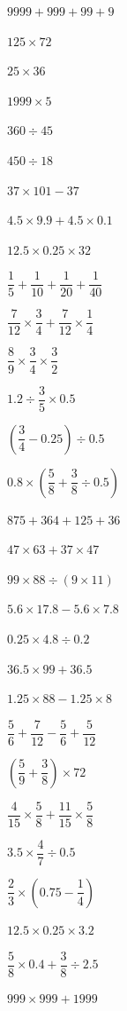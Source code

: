 \documentclass[a4paper,12pt]{ctexart}
\begin{document}
\begin{exercise}
\item $9999+999+99+9$
\item $125\times72$
\item $25\times36$
\item $1999\times5$
\item $360\div45$
\item $450\div18$
\item $37\times101-37$
\item $4.5\times9.9+4.5\times0.1$
\item $12.5\times0.25\times32$
\item $\dfrac{1}{5}+\dfrac{1}{10}+\dfrac{1}{20}+\dfrac{1}{40}$
\item $\dfrac{7}{12}\times\dfrac{3}{4}+\dfrac{7}{12}\times\dfrac{1}{4}$
\item $\dfrac{8}{9}\times\dfrac{3}{4}\times\dfrac{3}{2}$
\item $1.2\div\dfrac{3}{5}\times0.5$
\item $\left(\dfrac{3}{4}-0.25\right)\div0.5$
\item $0.8\times\left(\dfrac{5}{8}+\dfrac{3}{8}\div0.5\right)$
\end{exercise}

\newpage


\begin{exercise}
\item $875+364+125+36$
\item $47\times63+37\times47$
\item $99\times88\div(9\times11)$
\item $5.6\times17.8-5.6\times7.8$
\item $0.25\times4.8\div0.2$
\item $36.5\times99+36.5$
\item $1.25\times88-1.25\times8$
\item $\dfrac{5}{6}+\dfrac{7}{12}-\dfrac{5}{6}+\dfrac{5}{12}$
\item $\left(\dfrac{5}{9}+\dfrac{3}{8}\right)\times72$
\item $\dfrac{4}{15}\times\dfrac{5}{8}+\dfrac{11}{15}\times\dfrac{5}{8}$
\item $3.5\times\dfrac{4}{7}\div0.5$
\item $\dfrac{2}{3}\times\left(0.75-\dfrac{1}{4}\right)$
\item $12.5\times0.25\times3.2$
\item $\dfrac{5}{8}\times0.4+\dfrac{3}{8}\div2.5$
\item $999\times999+1999$
\end{exercise}
\end{document}

